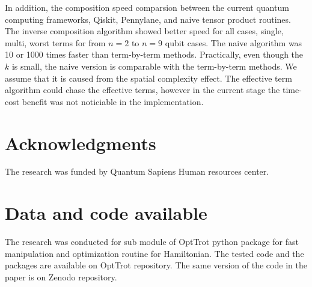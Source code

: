 \documentclass[twocolumn]{article}
\begin{document}
In addition, the composition speed comparsion between the current quantum computing frameworks, Qiskit, Pennylane, and naive
tensor product routines. 
The inverse composition algorithm showed better speed for all cases, single, multi, worst terms 
for from $n=2$ to $n=9$ qubit cases. 
The naive algorithm was 10 or 1000 times faster than term-by-term methods.
Practically, even though the $k$ is small, the naive version is comparable 
with the term-by-term methods. 
We assume that it is caused from the spatial complexity effect.
The effective term algorithm could chase the effective terms, however in the current stage the time-cost benefit 
was not noticiable in the implementation.

\section*{Acknowledgments}
The research was funded by Quantum Sapiens Human resources center.

\section*{Data and code available}
The research was conducted for sub module of OptTrot python package for 
fast manipulation and optimization routine for Hamiltonian.
The tested code and the packages are available on OptTrot repository.
The same version of the code in the paper is on 
Zenodo repository\cite{kim_2024_11048922}.
  
  

\appendix
%
%
%
%
%
\end{document}
